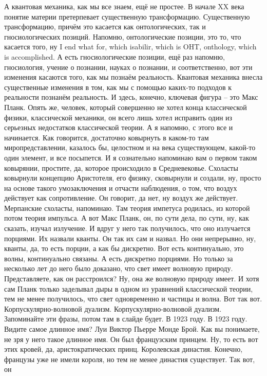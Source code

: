 А квантовая механика, как мы все знаем,
ещё не простее. В начале XX века понятие материи претерпевает существенную
трансформацию. Существенную трансформацию, причём это касается как
онтологических, так и гносиологических позиций. Напомню, онтологические позиции,
это то, что касается того, ну  I end what for, which isabilir, which is OHT,
onthology, which is accomplished. А есть гносиологические позиции, ещё раз
напомню, гносиология, учение о познании, науках о познании, и соответственно,
вот эти изменения касаются того, как мы познаём реальность. Квантовая механика
внесла существенные изменения в том, как мы с помощью каких-то подходов к
реальности познанём реальность. И здесь, конечно, ключевая фигура – это Макс
Планк. Опять же, человек, который совершенно не хотел конца классической физики,
классической механики, он всего лишь хотел исправить один из серьезных
недостатков классической теории. А я напомню, с этого все и начинается. Как
говорится, достаточно ковырнуть в каком-то там миропредставлении, казалось бы,
целостном и на века существующем, какой-то один элемент, и все посыпется. И я
сознательно напоминаю вам о первом таком ковырянии, простите, да, которое
происходило в Средневековье. Схоласты ковырнули концепцию Аристотеля, его
физику, сковырнули и создали, ну, просто на основе такого умозаключения и
отчасти наблюдения, о том, что воздух действует как сопротивление. Он говорит,
да нет, ну воздух же действует. Мерпанские схоласты, напоминаю.
Там теория импетуса родилась, из которой потом теория импульса. А вот Макс
Планк, он, по сути дела, по сути, ну, как сказать, изучал излучение. И вдруг у
него так получилось, что оно излучается порциями. Их назвали кванты. Он так их
сам и назвал. Но они непрерывно, ну, кванты, да, то есть порции, а как бы
дискретно. Вот есть континуально, это волны, континуально связаны. А есть
дискретно порциями. Но только за несколько лет до него было доказано, что свет
имеет волновую природу. Представляете, как он расстроился? Ну, она же волновую
природу имеет. И хотя сам Планк только заделывал дыры в одном из уравнений
классической теории, тем не менее получилось, что свет одновременно и частицы и
волна. Вот так вот. Корпускулярно-волновой дуализм. Корпускулярно-волновой
дуализм. Запоминайте эти фразы, потом там в слайде будет. В 1923 году. В 1923
году. Видите самое длинное имя? Луи Виктор Пьерре Монде Брой. Как вы понимаете,
не зря у него такое длинное имя. Он был французским принцем. Ну, то есть вот
этих кровей, да, аристократических принц. Королевская династия. Конечно,
французы уже не имели короля, но тем не менее династия существует. Так вот, он
